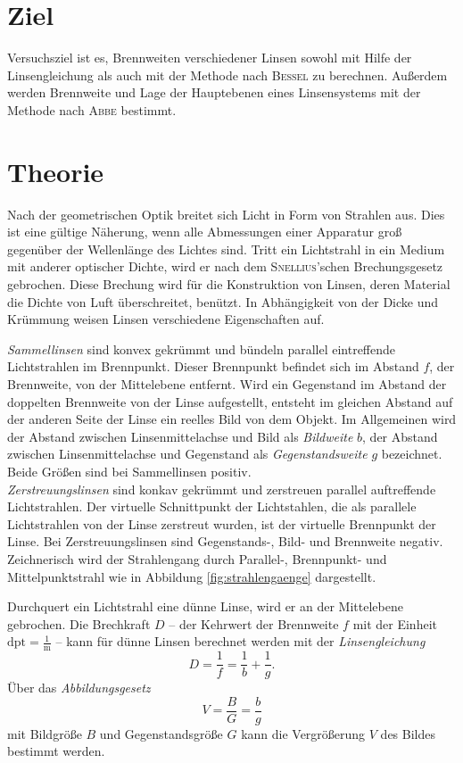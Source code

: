 \section{Ziel}
\label{sec:Ziel}

Versuchsziel ist es, Brennweiten verschiedener Linsen sowohl mit Hilfe der Linsengleichung als auch mit der Methode nach \textsc{Bessel} zu berechnen. 
Außerdem werden Brennweite und Lage der Hauptebenen eines Linsensystems mit der Methode nach \textsc{Abbe} bestimmt.

\section{Theorie}
\label{sec:Theorie}
Nach der geometrischen Optik breitet sich Licht in Form von Strahlen aus. 
Dies ist eine gültige Näherung, wenn alle Abmessungen einer Apparatur groß gegenüber der Wellenlänge des Lichtes sind. 
Tritt ein Lichtstrahl in ein Medium mit anderer optischer Dichte, wird er nach dem \textsc{Snellius}'schen Brechungsgesetz gebrochen. 
Diese Brechung wird für die Konstruktion von Linsen, deren Material die Dichte von Luft überschreitet, benützt.
In Abhängigkeit von der Dicke und Krümmung weisen Linsen verschiedene Eigenschaften auf. 

\emph{Sammellinsen} sind konvex gekrümmt und bündeln parallel eintreffende Lichtstrahlen im Brennpunkt. Dieser Brennpunkt befindet sich im Abstand $f$, der Brennweite, von der Mittelebene entfernt. 
Wird ein Gegenstand im Abstand der doppelten Brennweite von der Linse aufgestellt, entsteht im gleichen Abstand auf der anderen Seite der Linse ein reelles Bild von dem Objekt. 
Im Allgemeinen wird der Abstand zwischen Linsenmittelachse und Bild als \emph{Bildweite} $b$, der Abstand zwischen Linsenmittelachse und Gegenstand als \emph{Gegenstandsweite} $g$ bezeichnet. Beide Größen sind bei Sammellinsen positiv.\\
\emph{Zerstreuungslinsen} sind konkav gekrümmt und zerstreuen parallel auftreffende Lichtstrahlen. 
Der virtuelle Schnittpunkt der Lichtstahlen, die als parallele Lichtstrahlen von der Linse zerstreut wurden, ist der virtuelle Brennpunkt der Linse.
Bei Zerstreuungslinsen sind Gegenstands-, Bild- und Brennweite negativ.
Zeichnerisch wird der Strahlengang durch Parallel-, Brennpunkt- und Mittelpunktstrahl wie in Abbildung \ref{fig:strahlengaenge} dargestellt.

Durchquert ein Lichtstrahl eine dünne Linse, wird er an der Mittelebene gebrochen.
Die Brechkraft $D$ -- der Kehrwert der Brennweite $f$ mit der Einheit $ \mathrm{dpt}=\frac{1}{\si{\meter}}$ -- kann für dünne Linsen berechnet werden mit der \emph{Linsengleichung}
\begin{equation}
	D=\frac{1}{f}=\frac{1}{b}+\frac{1}{g}.
\end{equation}
Über das \emph{Abbildungsgesetz} 
\begin{equation}
	V=\frac{B}{G}=\frac{b}{g}
\end{equation}
mit Bildgröße $B$ und Gegenstandsgröße $G$ kann die Vergrößerung $V$ des Bildes bestimmt werden.

